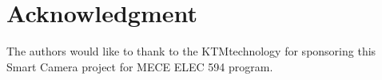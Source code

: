 \documentclass[journal,transmag]{IEEEtran}
\begin{document}


\section*{Acknowledgment}


The authors would like to thank to the KTMtechnology for sponsoring this Smart Camera project for MECE ELEC 594 program.


\ifCLASSOPTIONcaptionsoff
  \newpage
\fi




\end{document}
